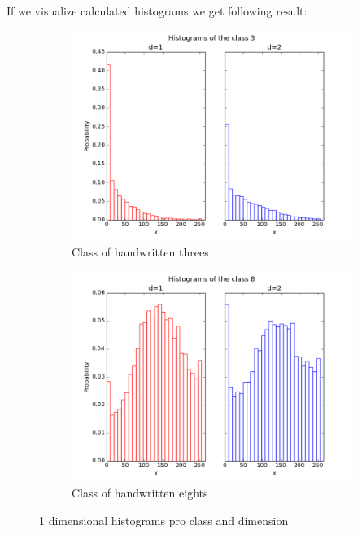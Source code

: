 \documentclass{article}
\begin{document}
If we visualize calculated histograms we get following result:

\begin{figure}[hb]
        \centering
        \begin{subfigure}[b]{0.5\textwidth}
                \includegraphics[width=\textwidth]{../histograms3.png}
                \caption{Class of handwritten threes}
        \end{subfigure}%
        \begin{subfigure}[b]{0.5\textwidth}
                \includegraphics[width=\textwidth]{../histograms8.png}
                \caption{Class of handwritten eights}
        \end{subfigure}
        \caption{1 dimensional histograms pro class and dimension}
        \label{img4}
\end{figure}
\end{document}
